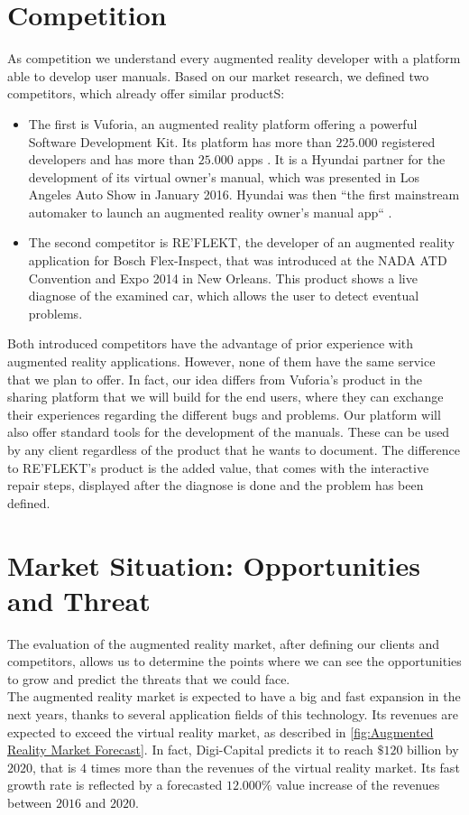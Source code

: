 \section{Competition}
	As competition we understand every augmented reality developer with a platform able to develop user manuals. Based on our market research, we defined two competitors, which already offer similar productS:
	
\begin{itemize}
	\item The first is Vuforia, an augmented reality platform offering a powerful Software Development Kit. Its platform has more than $225.000$ registered developers and has more than $25.000$ apps \footnotemark. 
It is a Hyundai partner for the development of its virtual owner’s manual, which was presented in Los Angeles Auto Show in January 2016. Hyundai was then “the first mainstream automaker to launch an augmented reality owner’s manual app“ \footnotemark. 
	\item The second competitor is RE’FLEKT, the developer of an augmented reality application for Bosch Flex-Inspect, that was introduced at the NADA ATD Convention and Expo 2014 in New Orleans. This product shows a live diagnose of the examined car, which allows the user to detect eventual problems. 
\end{itemize}

	 Both introduced competitors have the advantage of prior experience with augmented reality applications. However, none of them have the same service that we plan to offer. In fact, our idea differs from Vuforia’s product in the sharing platform that we will build for the end users, where they can exchange their experiences regarding the different bugs and problems. Our platform will also offer standard tools for the development of the manuals. These can be used by any client regardless of the product that he wants to document. The difference to RE’FLEKT’s product is the added value, that comes with the interactive repair steps, displayed after the diagnose is done and the problem has been defined. 
	 
\section{Market Situation: Opportunities and Threat}
The evaluation of the augmented reality market, after defining our clients and competitors, allows us to determine the points where we can see the opportunities to grow and predict the threats that we could face.
\\
	The augmented reality market is expected to have a big and fast expansion in the next years, thanks to several application fields of this technology. Its revenues are expected to exceed the virtual reality market, as described in \autoref{fig:Augmented Reality Market Forecast}. In fact, Digi-Capital predicts it to reach $ \$120 $ billion by $2020$, that is $4$ times more than the revenues of the virtual reality market. Its fast growth rate is reflected by a forecasted $12.000\%$ value increase of the revenues between $2016$ and $2020$. 
	
